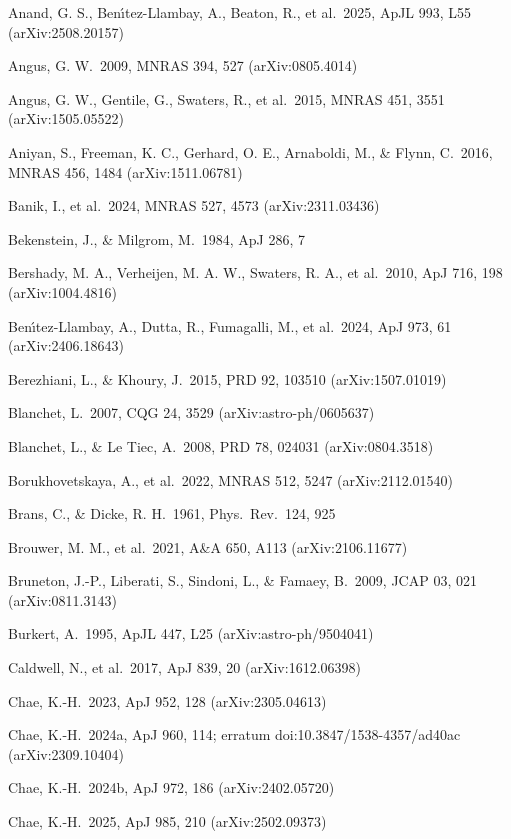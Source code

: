 \documentclass[
  10pt,
]{article}
\begin{document}
{\small
\begin{list}{}{\setlength{\leftmargin}{1.5em}\setlength{\itemindent}{-1.5em}\setlength{\itemsep}{1pt}\setlength{\parsep}{0pt}}
\item Anand, G. S., Ben\'{\i}tez-Llambay, A., Beaton, R., et al.\ 2025, ApJL 993, L55 (arXiv:2508.20157)
\item Angus, G. W.\ 2009, MNRAS 394, 527 (arXiv:0805.4014)
\item Angus, G. W., Gentile, G., Swaters, R., et al.\ 2015, MNRAS 451, 3551 (arXiv:1505.05522)
\item Aniyan, S., Freeman, K. C., Gerhard, O. E., Arnaboldi, M., \& Flynn, C.\ 2016, MNRAS 456, 1484 (arXiv:1511.06781)
\item Banik, I., et al.\ 2024, MNRAS 527, 4573 (arXiv:2311.03436)
\item Bekenstein, J., \& Milgrom, M.\ 1984, ApJ 286, 7
\item Bershady, M. A., Verheijen, M. A. W., Swaters, R. A., et al.\ 2010, ApJ 716, 198 (arXiv:1004.4816)
\item Ben\'{\i}tez-Llambay, A., Dutta, R., Fumagalli, M., et al.\ 2024, ApJ 973, 61 (arXiv:2406.18643)
\item Berezhiani, L., \& Khoury, J.\ 2015, PRD 92, 103510 (arXiv:1507.01019)
\item Blanchet, L.\ 2007, CQG 24, 3529 (arXiv:astro-ph/0605637)
\item Blanchet, L., \& Le Tiec, A.\ 2008, PRD 78, 024031 (arXiv:0804.3518)
\item Borukhovetskaya, A., et al.\ 2022, MNRAS 512, 5247 (arXiv:2112.01540)
\item Brans, C., \& Dicke, R. H.\ 1961, Phys.\ Rev.\ 124, 925
\item Brouwer, M. M., et al.\ 2021, A\&A 650, A113 (arXiv:2106.11677)
\item Bruneton, J.-P., Liberati, S., Sindoni, L., \& Famaey, B.\ 2009, JCAP 03, 021 (arXiv:0811.3143)
\item Burkert, A.\ 1995, ApJL 447, L25 (arXiv:astro-ph/9504041)
\item Caldwell, N., et al.\ 2017, ApJ 839, 20 (arXiv:1612.06398)
\item Chae, K.-H.\ 2023, ApJ 952, 128 (arXiv:2305.04613)
\item Chae, K.-H.\ 2024a, ApJ 960, 114; erratum doi:10.3847/1538-4357/ad40ac (arXiv:2309.10404)
\item Chae, K.-H.\ 2024b, ApJ 972, 186 (arXiv:2402.05720)
\item Chae, K.-H.\ 2025, ApJ 985, 210 (arXiv:2502.09373)

\end{list}}
\end{document}
